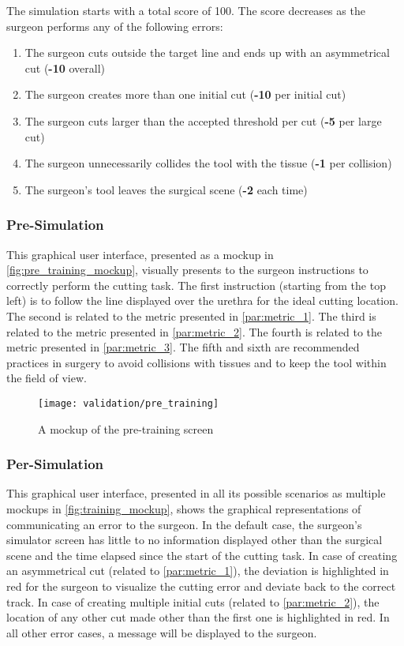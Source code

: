The simulation starts with a total score of 100. The score decreases as the surgeon performs any of the following errors:
\begin{enumerate}[1.]
  \item The surgeon cuts outside the target line and ends up with an asymmetrical cut (\textbf{-10} overall)
  \item The surgeon creates more than one initial cut (\textbf{-10} per initial cut)
  \item The surgeon cuts larger than the accepted threshold per cut (\textbf{-5} per large cut)
  \item The surgeon unnecessarily collides the tool with the tissue (\textbf{-1} per collision)
  \item The surgeon's tool leaves the surgical scene (\textbf{-2} each time)
\end{enumerate}

\subsubsection{Pre-Simulation}
This graphical user interface, presented as a mockup in \autoref{fig:pre_training_mockup}, visually presents to the surgeon instructions to correctly perform the cutting task. The first instruction (starting from the top left) is to follow the line displayed over the urethra for the ideal cutting location. The second is related to the metric presented in \autoref{par:metric_1}. The third is related to the metric presented in \autoref{par:metric_2}. The fourth is related to the metric presented in \autoref{par:metric_3}. The fifth and sixth are recommended practices in surgery to avoid collisions with tissues and to keep the tool within the field of view.
\begin{figure}
  \centering%
  \texttt{[image: validation/pre\_training]}
  \caption{A mockup of the pre-training screen}\label{fig:pre_training_mockup}
\end{figure}

\subsubsection{Per-Simulation}
This graphical user interface, presented in all its possible scenarios as multiple mockups in \autoref{fig:training_mockup}, shows the graphical representations of communicating an error to the surgeon. In the default case, the surgeon's simulator screen has little to no information displayed other than the surgical scene and the time elapsed since the start of the cutting task. In case of creating an asymmetrical cut (related to \autoref{par:metric_1}), the deviation is highlighted in red for the surgeon to visualize the cutting error and deviate back to the correct track. In case of creating multiple initial cuts (related to \autoref{par:metric_2}), the location of any other cut made other than the first one is highlighted in red. In all other error cases, a message will be displayed to the surgeon.

